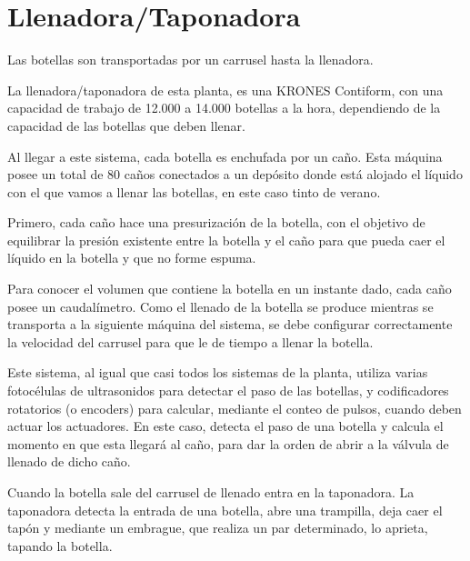\documentclass[11pt,a4paper,spanish,twoside]{report}
\begin{document}
\section{Llenadora/Taponadora}
Las botellas son transportadas por un carrusel hasta la llenadora.

La llenadora/taponadora de esta planta, es una KRONES Contiform, con una 
capacidad de trabajo de 12.000 a 14.000 botellas a la hora, dependiendo de la 
capacidad de las botellas que deben llenar.

Al llegar a este sistema, cada botella es enchufada por un caño. Esta máquina 
posee un total de 80 caños conectados a un depósito donde está alojado el 
líquido con el que vamos a llenar las botellas, en este caso tinto de verano.

Primero, cada caño hace una presurización de la botella, con el objetivo de 
equilibrar la presión existente entre la botella y el caño para que pueda caer 
el líquido en la botella y que no forme espuma.

Para conocer el volumen que contiene la botella en un instante dado, cada caño 
posee un caudalímetro. Como el llenado de la botella se produce mientras se 
transporta a la siguiente máquina del sistema, se debe configurar correctamente
la velocidad del carrusel para que le de tiempo a llenar la botella.

Este sistema, al igual que casi todos los sistemas de la planta, utiliza varias
fotocélulas de ultrasonidos para detectar el paso de las botellas, y 
codificadores rotatorios (o encoders) para calcular, mediante el conteo de 
pulsos, cuando deben actuar los actuadores. En este caso, detecta el paso de 
una botella y calcula el momento en que esta llegará al caño, para dar la orden
de abrir a la válvula de llenado de dicho caño.

Cuando la botella sale del carrusel de llenado entra en la taponadora. La 
taponadora detecta la entrada de una botella, abre una trampilla, deja caer el 
tapón y mediante un embrague, que realiza un par determinado, lo aprieta, 
tapando la botella.
\end{document}
